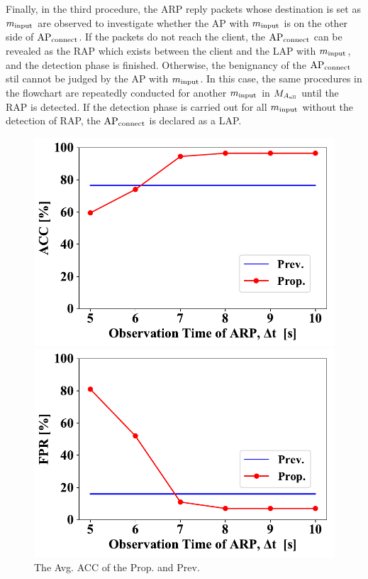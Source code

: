 \documentclass[conference]{IEEEtran}
\newcommand{\tarAP}{\rm AP_{connect}}
\newcommand{\inputMAC}{m_{\rm input}}
\begin{document}
Finally, in the third procedure, the ARP reply packets whose destination is set as $\inputMAC$ are observed to investigate whether the AP with $\inputMAC$ is on the other side of $\tarAP$.
If the packets do not reach the client, the $\tarAP$ can be revealed as the RAP which exists between the client and the LAP with $\inputMAC$, and the detection phase is finished.
Otherwise, the benignancy of the $\tarAP$ stil cannot be judged by the AP with $\inputMAC$.
In this case, the same procedures in the flowchart are repeatedly conducted for another $\inputMAC$ in $M_{A_{\rm all}}$ until the RAP is detected.
If the detection phase is carried out for all $\inputMAC$ without the detection of RAP, the $\tarAP$ is declared as a LAP.
\begin{figure}[ht]
    \begin{minipage}{0.33\hsize}
        \begin{center}
            \includegraphics[scale=0.34]{figure/ACC.pdf}
        \end{center}
        \caption{The Avg. ACC of the Prop. and Prev.}
        \label{fig:acc}
    \end{minipage}
        \begin{minipage}{0.33\hsize}
        \begin{center}
            \includegraphics[scale=0.34]{figure/FPR.pdf}

\end{center}
\end{minipage}
\end{figure}
\end{document}
